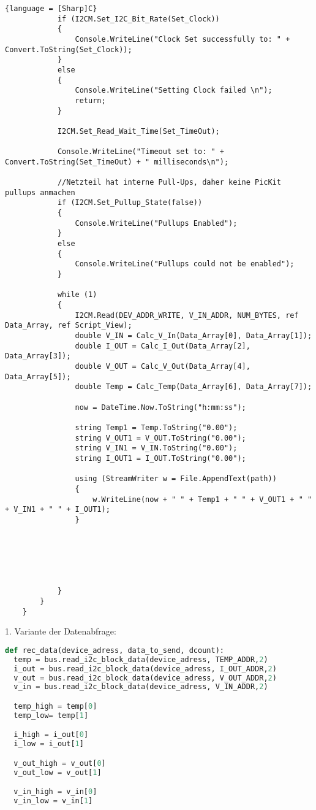 \begin{lstlisting}{language = [Sharp]C}
            if (I2CM.Set_I2C_Bit_Rate(Set_Clock))
            {
                Console.WriteLine("Clock Set successfully to: " + Convert.ToString(Set_Clock));
            }
            else
            {
                Console.WriteLine("Setting Clock failed \n");
                return;
            }

            I2CM.Set_Read_Wait_Time(Set_TimeOut);

            Console.WriteLine("Timeout set to: " + Convert.ToString(Set_TimeOut) + " milliseconds\n");

            //Netzteil hat interne Pull-Ups, daher keine PicKit pullups anmachen        
            if (I2CM.Set_Pullup_State(false))
            {
                Console.WriteLine("Pullups Enabled");
            }
            else
            {
                Console.WriteLine("Pullups could not be enabled");
            }
          
            while (1)
            {
                I2CM.Read(DEV_ADDR_WRITE, V_IN_ADDR, NUM_BYTES, ref Data_Array, ref Script_View);
                double V_IN = Calc_V_In(Data_Array[0], Data_Array[1]);
                double I_OUT = Calc_I_Out(Data_Array[2], Data_Array[3]);
                double V_OUT = Calc_V_Out(Data_Array[4], Data_Array[5]);
                double Temp = Calc_Temp(Data_Array[6], Data_Array[7]);

                now = DateTime.Now.ToString("h:mm:ss");

                string Temp1 = Temp.ToString("0.00");
                string V_OUT1 = V_OUT.ToString("0.00");
                string V_IN1 = V_IN.ToString("0.00");
                string I_OUT1 = I_OUT.ToString("0.00");

                using (StreamWriter w = File.AppendText(path))
                {
                    w.WriteLine(now + " " + Temp1 + " " + V_OUT1 + " " + V_IN1 + " " + I_OUT1);
                }






            }
        }
    }

\end{lstlisting}

\newpage

1. Variante der Datenabfrage: \\

\begin{lstlisting}[language = Python]
def rec_data(device_adress, data_to_send, dcount):
  temp = bus.read_i2c_block_data(device_adress, TEMP_ADDR,2)
  i_out = bus.read_i2c_block_data(device_adress, I_OUT_ADDR,2)
  v_out = bus.read_i2c_block_data(device_adress, V_OUT_ADDR,2)
  v_in = bus.read_i2c_block_data(device_adress, V_IN_ADDR,2)

  temp_high = temp[0]
  temp_low= temp[1]

  i_high = i_out[0]
  i_low = i_out[1]

  v_out_high = v_out[0]
  v_out_low = v_out[1]

  v_in_high = v_in[0]
  v_in_low = v_in[1]

\end{lstlisting}


